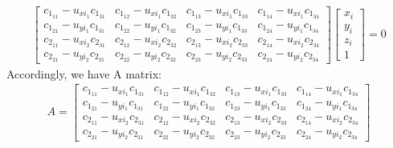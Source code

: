 \begin{your_solution}[title=Q3.2,height=22.5cm,width=\linewidth]
\begin{align}
\begin{bmatrix}
		c_{1_{11}}-u_{xi_{1}}c_{1_{31}} & c_{1_{12}}-u_{xi_{1}}c_{1_{32}} & c_{1_{13}}-u_{xi_{1}}c_{1_{33}} & c_{1_{14}}-u_{xi_{1}}c_{1_{34}} \\
		c_{1_{21}}-u_{yi_{1}}c_{1_{31}} & c_{1_{22}}-u_{yi_{1}}c_{1_{32}} & c_{1_{23}}-u_{yi_{1}}c_{1_{33}} & c_{1_{24}}-u_{yi_{1}}c_{1_{34}} \\
		c_{2_{11}}-u_{xi_{2}}c_{2_{31}} & c_{2_{12}}-u_{xi_{2}}c_{2_{32}} & c_{2_{13}}-u_{xi_{2}}c_{2_{33}} & c_{2_{14}}-u_{xi_{2}}c_{2_{34}} \\
		c_{2_{21}}-u_{yi_{2}}c_{2_{31}} & c_{2_{22}}-u_{yi_{2}}c_{2_{32}} & c_{2_{23}}-u_{yi_{2}}c_{2_{33}} & c_{2_{24}}-u_{yi_{2}}c_{2_{34}}
	\end{bmatrix} \begin{bmatrix} x_i \\ y_i \\ z_i \\ 1 \end{bmatrix} = 0
\end{align}
Accordingly, we have A matrix: \newline
\begin{align}
A = \begin{bmatrix}
	c_{1_{11}}-u_{xi_{1}}c_{1_{31}} & c_{1_{12}}-u_{xi_{1}}c_{1_{32}} & c_{1_{13}}-u_{xi_{1}}c_{1_{33}} & c_{1_{14}}-u_{xi_{1}}c_{1_{34}} \\
	c_{1_{21}}-u_{yi_{1}}c_{1_{31}} & c_{1_{22}}-u_{yi_{1}}c_{1_{32}} & c_{1_{23}}-u_{yi_{1}}c_{1_{33}} & c_{1_{24}}-u_{yi_{1}}c_{1_{34}} \\
	c_{2_{11}}-u_{xi_{2}}c_{2_{31}} & c_{2_{12}}-u_{xi_{2}}c_{2_{32}} & c_{2_{13}}-u_{xi_{2}}c_{2_{33}} & c_{2_{14}}-u_{xi_{2}}c_{2_{34}} \\
	c_{2_{21}}-u_{yi_{2}}c_{2_{31}} & c_{2_{22}}-u_{yi_{2}}c_{2_{32}} & c_{2_{23}}-u_{yi_{2}}c_{2_{33}} & c_{2_{24}}-u_{yi_{2}}c_{2_{34}}
\end{bmatrix}
\end{align}
\end{your_solution}

